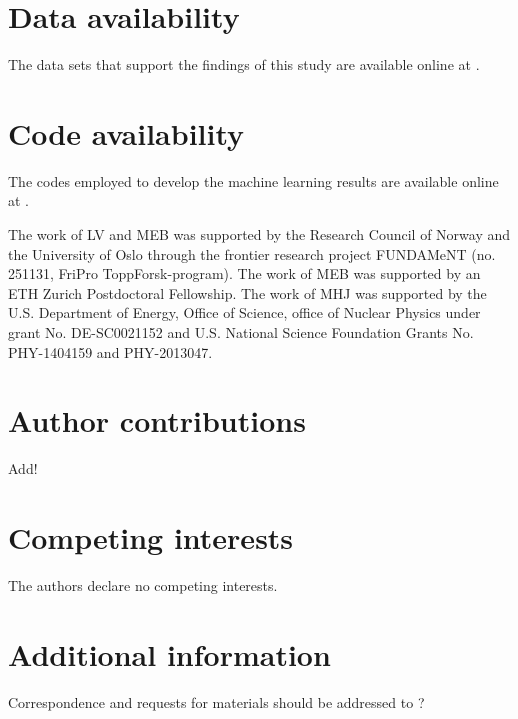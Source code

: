 \documentclass[superscriptaddress,unsortedaddress,
 amsmath,amssymb,
 aps,
]{revtex4-2}
\begin{document}
\section*{Data availability} 
The data sets that support the findings of this study are available online at \cite{Ohebbi2021}.

\section*{Code availability} 
The codes employed to develop the machine learning results are available online at 
\cite{Ohebbi2021}.



\begin{acknowledgments}

The work of LV and MEB was supported by the Research Council of Norway and the University of Oslo through the frontier research project FUNDAMeNT (no. 251131, FriPro ToppForsk-program). 
The work of MEB was supported by an ETH Zurich Postdoctoral Fellowship. 
The work of MHJ was supported by the U.S. Department of Energy,
Office of Science, office of Nuclear Physics under grant
No. DE-SC0021152 and U.S. National Science Foundation Grants
No. PHY-1404159 and PHY-2013047. 


\end{acknowledgments}

\section*{Author contributions}
Add! 

\section*{Competing interests}
The authors declare no competing interests.

\section*{Additional information}
Correspondence and requests for materials should be addressed to ?
\end{document}
